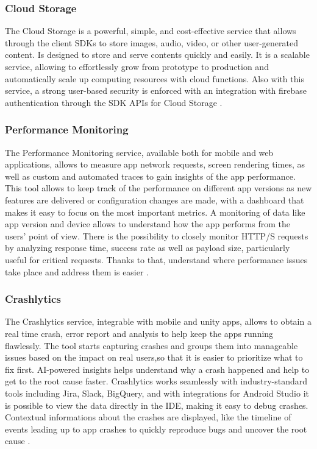 \subsubsection{Cloud Storage}
The Cloud Storage is a powerful, simple, and cost-effective service that allows through the client SDKs to store images, audio, video, or other user-generated content. Is designed to store and serve contents quickly and easily. It is a scalable service, allowing to effortlessly grow from prototype to production and automatically scale up computing resources with cloud functions. Also with this service, a strong user-based security is enforced with an integration with firebase authentication through the SDK APIs for Cloud Storage \cite{CloudStorage}.
\subsubsection{Performance Monitoring}
The Performance Monitoring service, available both for mobile and web applications, allows to measure app network requests, screen rendering times, as well as custom and automated traces to gain insights of the app performance. This tool allows to keep track of the performance on different app versions as new features are delivered or configuration changes are made, with a dashboard that makes it easy to focus on the most important metrics. A monitoring of data like app version and device allows to understand how the app performs from the users' point of view. There is the possibility to closely monitor HTTP/S requests by analyzing response time, success rate as well as payload size, particularly useful for critical requests. Thanks to that, understand where performance issues take place and address them is easier \cite{PerformanceMonitoring}.
\subsubsection{Crashlytics}
The Crashlytics service, integrable with mobile and unity apps, allows to obtain a real time crash, error report and analysis to help keep the apps running flawlessly. The tool starts capturing crashes and groups them into manageable issues based on the impact on real users,so that it is easier to prioritize what to fix first. AI-powered insights helps understand why a crash happened and help to get to the root cause faster. Crashlytics works seamlessly with industry-standard tools including Jira, Slack, BigQuery, and with integrations for Android Studio it is possible to view the data directly in the IDE, making it easy to debug crashes. Contextual informations about the crashes are displayed, like the timeline of events leading up to app crashes to quickly reproduce bugs and uncover the root cause \cite{Crashlytics}.


